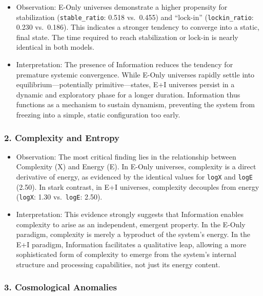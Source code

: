 \begin{itemize}
\item
  Observation: E-Only universes demonstrate a higher propensity for
  stabilization (\texttt{stable\_ratio}: 0.518 vs.~0.455) and
  ``lock-in'' (\texttt{lockin\_ratio}: 0.230 vs.~0.186). This indicates
  a stronger tendency to converge into a static, final state. The time
  required to reach stabilization or lock-in is nearly identical in both
  models.
\item
  Interpretation: The presence of Information reduces the tendency for
  premature systemic convergence. While E-Only universes rapidly settle
  into equilibrium---potentially primitive---states, E+I universes
  persist in a dynamic and exploratory phase for a longer duration.
  Information thus functions as a mechanism to sustain dynamism,
  preventing the system from freezing into a simple, static
  configuration too early.
\end{itemize}

\subsubsection{2. Complexity and Entropy}\label{complexity-and-entropy}

\begin{itemize}
\item
  Observation: The most critical finding lies in the relationship
  between Complexity (X) and Energy (E). In E-Only universes, complexity
  is a direct derivative of energy, as evidenced by the identical values
  for \texttt{logX} and \texttt{logE} (2.50). In stark contrast, in E+I
  universes, complexity decouples from energy (\texttt{logX}: 1.30
  vs.~\texttt{logE}: 2.50).
\item
  Interpretation: This evidence strongly suggests that Information
  enables complexity to arise as an independent, emergent property. In
  the E-Only paradigm, complexity is merely a byproduct of the system's
  energy. In the E+I paradigm, Information facilitates a qualitative
  leap, allowing a more sophisticated form of complexity to emerge from
  the system's internal structure and processing capabilities, not just
  its energy content.
\end{itemize}

\subsubsection{3. Cosmological Anomalies}\label{cosmological-anomalies}

